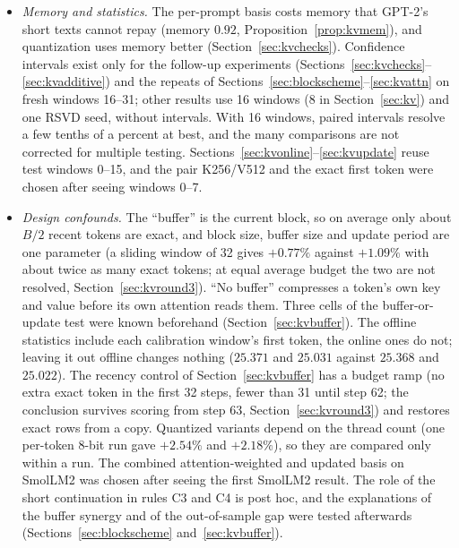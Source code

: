 \documentclass[10pt]{article}
\theoremstyle{plain}
\theoremstyle{definition}
\theoremstyle{remark}
\newcommand{\rl}[1]{\textsf{#1}}%
\begin{document}
\begin{itemize}[leftmargin=2em,itemsep=1pt]
\item \emph{Memory and statistics.} The per-prompt basis costs memory that GPT-2's short texts cannot repay (memory $0.92$, Proposition~\ref{prop:kvmem}), and quantization uses memory better (Section~\ref{sec:kvchecks}). Confidence intervals exist only for the follow-up experiments (Sections~\ref{sec:kvchecks}--\ref{sec:kvadditive}) and the repeats of Sections~\ref{sec:blockscheme}--\ref{sec:kvattn} on fresh windows 16--31; other results use 16 windows (8 in Section~\ref{sec:kv}) and one RSVD seed, without intervals. With 16 windows, paired intervals resolve a few tenths of a percent at best, and the many comparisons are not corrected for multiple testing. Sections~\ref{sec:kvonline}--\ref{sec:kvupdate} reuse test windows 0--15, and the pair K256/V512 and the exact first token were chosen after seeing windows 0--7.
\item \emph{Design confounds.} The ``buffer'' is the current block, so on average only about $B/2$ recent tokens are exact, and block size, buffer size and update period are one parameter (a sliding window of 32 gives $+0.77\%$ against $+1.09\%$ with about twice as many exact tokens; at equal average budget the two are not resolved, Section~\ref{sec:kvround3}). ``No buffer'' compresses a token's own key and value before its own attention reads them. Three cells of the buffer-or-update test were known beforehand (Section~\ref{sec:kvbuffer}). The offline statistics include each calibration window's first token, the online ones do not; leaving it out offline changes nothing ($25.371$ and $25.031$ against $25.368$ and $25.022$). The recency control of Section~\ref{sec:kvbuffer} has a budget ramp (no extra exact token in the first 32 steps, fewer than 31 until step 62; the conclusion survives scoring from step 63, Section~\ref{sec:kvround3}) and restores exact rows from a copy. Quantized variants depend on the thread count (one per-token 8-bit run gave $+2.54\%$ and $+2.18\%$), so they are compared only within a run. The combined attention-weighted and updated basis on SmolLM2 was chosen after seeing the first SmolLM2 result. The role of the short continuation in rules \rl{C3} and \rl{C4} is post hoc, and the explanations of the buffer synergy and of the out-of-sample gap were tested afterwards (Sections~\ref{sec:blockscheme} and~\ref{sec:kvbuffer}).
\end{itemize}
\end{document}
